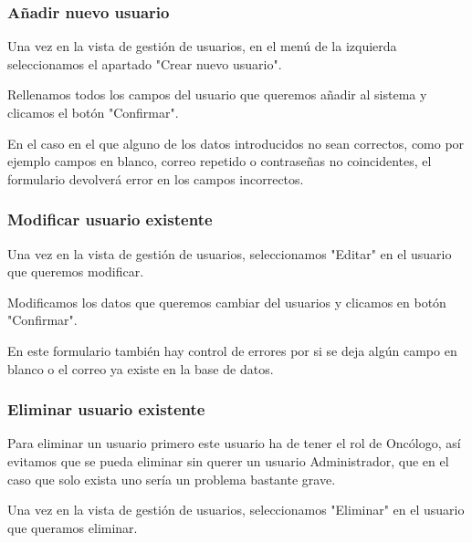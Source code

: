 
\subsubsection{Añadir nuevo usuario}

Una vez en la vista de gestión de usuarios, en el menú de la izquierda seleccionamos el apartado "{}Crear nuevo usuario"{}.


Rellenamos todos los campos del usuario que queremos añadir al sistema y clicamos el botón "{}Confirmar".  


En el caso en el que alguno de los datos introducidos no sean correctos, como por ejemplo campos en blanco, correo repetido o contraseñas no coincidentes, el formulario devolverá error en los campos incorrectos.

\subsubsection{Modificar usuario existente}

Una vez en la vista de gestión de usuarios, seleccionamos "{}Editar"{} en el usuario que queremos modificar. 


Modificamos los datos que queremos cambiar del usuarios y clicamos en botón "{}Confirmar".


En este formulario también hay control de errores por si se deja algún campo en blanco o el correo ya existe en la base de datos.

\subsubsection{Eliminar usuario existente}

Para eliminar un usuario primero este usuario ha de tener el rol de Oncólogo, así evitamos que se pueda eliminar sin querer un usuario Administrador, que en el caso que solo exista uno sería un problema bastante grave.

Una vez en la vista de gestión de usuarios, seleccionamos "{}Eliminar"{} en el usuario que queramos eliminar.

